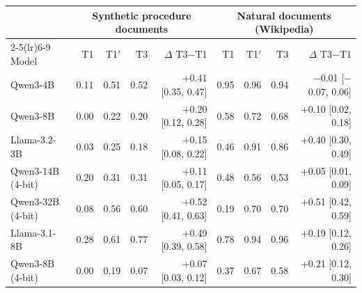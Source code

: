 \begin{tabular}{lrrrrrrrr}
\toprule
& \multicolumn{4}{c}{Synthetic procedure documents} & \multicolumn{4}{c}{Natural documents (Wikipedia)} \\
\cmidrule(lr){2-5}\cmidrule(lr){6-9}
Model & T1 & T1$'$ & T3 & $\Delta$ T3$-$T1 & T1 & T1$'$ & T3 & $\Delta$ T3$-$T1 \\
\midrule
Qwen3-4B & 0.11 & 0.51 & 0.52 & +0.41 [0.35, 0.47] & 0.95 & 0.96 & 0.94 & $-$0.01 [$-$0.07, 0.06] \\
Qwen3-8B & 0.00 & 0.22 & 0.20 & +0.20 [0.12, 0.28] & 0.58 & 0.72 & 0.68 & +0.10 [0.02, 0.18] \\
Llama-3.2-3B & 0.03 & 0.25 & 0.18 & +0.15 [0.08, 0.22] & 0.46 & 0.91 & 0.86 & +0.40 [0.30, 0.49] \\
Qwen3-14B (4-bit) & 0.20 & 0.31 & 0.31 & +0.11 [0.05, 0.17] & 0.48 & 0.56 & 0.53 & +0.05 [0.01, 0.09] \\
Qwen3-32B (4-bit) & 0.08 & 0.56 & 0.60 & +0.52 [0.41, 0.63] & 0.19 & 0.70 & 0.70 & +0.51 [0.42, 0.59] \\
Llama-3.1-8B & 0.28 & 0.61 & 0.77 & +0.49 [0.39, 0.58] & 0.78 & 0.94 & 0.96 & +0.19 [0.12, 0.26] \\
Qwen3-8B (4-bit) & 0.00 & 0.19 & 0.07 & +0.07 [0.03, 0.12] & 0.37 & 0.67 & 0.58 & +0.21 [0.12, 0.30] \\
\bottomrule
\end{tabular}
